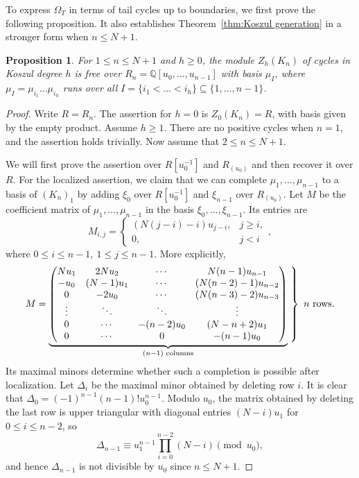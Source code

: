 \documentclass[reqno]{amsart}
\newtheorem{prop}[thm]{Proposition}
\theoremstyle{definition}
\theoremstyle{remark}
\newcommand{\QQ}{\mathbb{Q}}
\begin{document}
To express $\Omega_T$ in terms of tail cycles up to boundaries, we first prove the following proposition. It also establishes Theorem~\ref{thm:Koszul generation} in a stronger form when $n\le N+1$.

\begin{prop}\label{prop:cycles in short Koszul complexes}
For $1\le n\le N+1$ and $h\ge0$, the module $Z_h(K_n)$ of cycles in Koszul degree $h$ is free over $R_n=\QQ[u_0,\dots,u_{n-1}]$ with basis $\mu_I$, where $\mu_I=\mu_{i_1}\dots\mu_{i_h}$ runs over all $I=\{i_1<\dots<i_h\}\subseteq\{1,\dots,n-1\}$.
\end{prop}

\begin{proof}
Write $R=R_n$. The assertion for $h=0$ is $Z_0(K_n)=R$, with basis given by the empty product. Assume $h\ge1$. There are no positive cycles when $n=1$, and the assertion holds trivially. Now assume that $2\le n\le N+1$.

We will first prove the assertion over $R[u_0^{-1}]$ and $R_{(u_0)}$ and then recover it over $R$. For the localized assertion, we claim that we can complete $\mu_1,\dots,\mu_{n-1}$ to a basis of $(K_n)_1$ by adding $\xi_0$ over $R[u_0^{-1}]$ and $\xi_{n-1}$ over $R_{(u_0)}$. Let $M$ be the coefficient matrix of $\mu_1,\dots,\mu_{n-1}$ in the basis $\xi_0,\dots,\xi_{n-1}$. Its entries are \[M_{i,j}= \begin{cases} (N(j-i)-i)u_{j-i},&j\ge i,\\ 0,&j<i \end{cases},\] where $0\le i\le n-1,\ 1\le j\le n-1$. More explicitly, \begingroup
\def\matrixM{\begin{pmatrix}
Nu_1&2Nu_2&\cdots&N(n-1)u_{n-1}\\
-u_0&(N-1)u_1&\cdots&(N(n-2)-1)u_{n-2}\\
0&-2u_0&\cdots&(N(n-3)-2)u_{n-3}\\
\vdots&\ddots&\ddots&\vdots\\
0&\cdots&-(n-2)u_0&(N-n+2)u_1\\
0&\cdots&0&-(n-1)u_0
\end{pmatrix}}\[M=\underbrace{\matrixM}_{(n-1)\text{ columns}}\left.\vphantom{\matrixM}\right\}\ n\text{ rows}.\]\endgroup Its maximal minors determine whether such a completion is possible after localization. Let $\Delta_i$ be the maximal minor obtained by deleting row $i$. It is clear that $\Delta_0=(-1)^{n-1}(n-1)!u_0^{n-1}$. Modulo $u_0$, the matrix obtained by deleting the last row is upper triangular with diagonal entries $(N-i)u_1$ for $0\le i\le n-2$, so \[\Delta_{n-1}\equiv u_1^{n-1}\prod_{i=0}^{n-2}(N-i)\pmod{u_0},\]and hence $\Delta_{n-1}$ is not divisible by $u_0$ since $n\le N+1$.


\end{proof}
\end{document}
